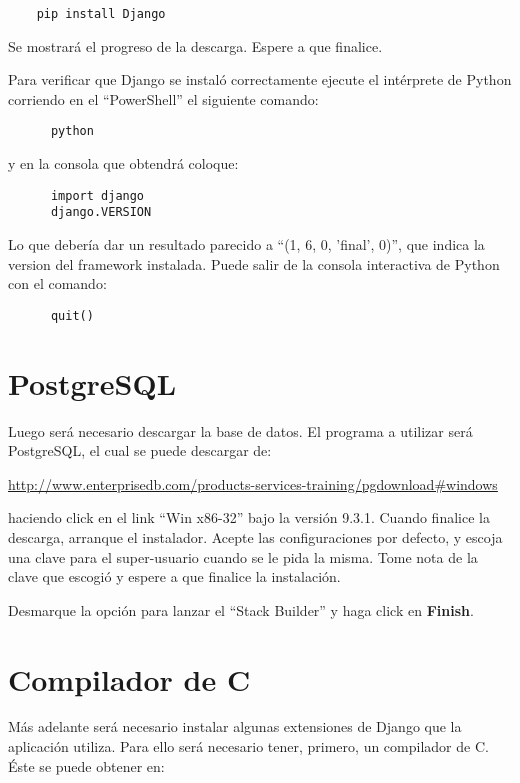 \documentclass[9pt, letterpaper, oneside]{report}
\begin{document}
    \begin{verbatim}
    pip install Django
    \end{verbatim}

    Se mostrará el progreso de la descarga. Espere a que finalice.

    Para verificar que Django se instaló correctamente ejecute el intérprete de
    Python corriendo en el ``PowerShell'' el siguiente comando:

    \begin{verbatim}
      python
    \end{verbatim}

    y en la consola que obtendrá coloque:

    \begin{verbatim}
      import django
      django.VERSION
    \end{verbatim}
      
    Lo que debería dar un resultado parecido a ``(1, 6, 0, 'final', 0)'',
    que indica
    la version del framework instalada. Puede salir de la consola interactiva de
    Python con el comando:

    \begin{verbatim}
      quit()
    \end{verbatim}

  \section{PostgreSQL}
    Luego será necesario descargar la base de datos. El programa a utilizar será
    PostgreSQL, el cual se puede descargar de:

    \vspace{3mm}
    \url{http://www.enterprisedb.com/products-services-training/pgdownload#windows}
    \vspace{3mm}
      
    haciendo click en el link ``Win x86-32'' bajo la versión 9.3.1. Cuando finalice la
    descarga, arranque el instalador. Acepte las configuraciones por defecto, y
    escoja una clave para el super-usuario cuando se le pida la misma. Tome nota de
    la clave que escogió y espere a que finalice la instalación.

    Desmarque la opción para lanzar el ``Stack Builder'' y haga click en
    \textbf{Finish}.

  \section{Compilador de C}
    Más adelante será necesario instalar algunas extensiones de Django que la aplicación
    utiliza. Para ello será necesario tener, primero, un compilador de C. Éste
    se puede obtener en:
\end{document}
